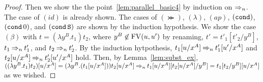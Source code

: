 \begin{proof}
  Then we show the the point~\ref{lem:parallel_basic4} by induction on $\mathbin{\Rightarrow_{n}}$.
  The case of $(id)$ is already shown. 
  The cases of $(\Succ)$, $(\lambda)$, $(ap)$, $({\tt cond})$, $({\tt cond}\,0)$, and $({\tt cond}\,{\tt S})$
  are shown by the induction hypothesis.
  We show the case $(\beta)$ with $t=(\lambda y^B.t_1)t_2$, where $y^B\not\in{{\rm FV}}(u,u')$ by renaming,
  $t'=t'_1[t'_2/y^B]$, $t_1\mathbin{\Rightarrow_{n}} t'_1$, and $t_2\mathbin{\Rightarrow_{n}} t'_2$. 
  By the induction hytpothesis, $t_1[u/x^A] \mathbin{\Rightarrow_{n}} t'_1[u'/x^A]$ and $t_2[u/x^A]\mathbin{\Rightarrow_{n}} t'_2[u'/x^A]$ hold.
  Then, by Lemma~\ref{lem:subst_ex},
  $((\lambda y^B.t_1)t_2)[u/x^A] = (\lambda y^B.(t_1[u/x^A]))t_2[u/x^A] \mathbin{\Rightarrow_{n}} t_1[u/x^A][t_2[u/x^A]/y^B] = t_1[t_2/y^B][u/x^A]$ as we wished. 
\end{proof}


